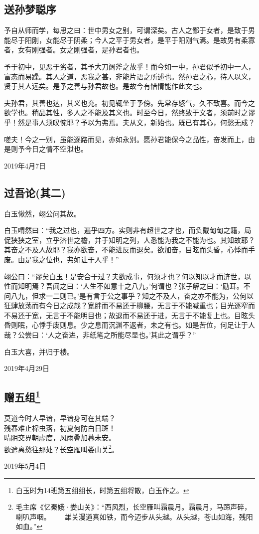 \documentclass[a5paper]{ctexart}
\begin{document}
	\subsection{送孙梦聪序}
	予自从师而学，每思之曰：世中男女之别，可谓深矣。古人之鄙于女者，是致于男能尽于阳刚，女能尽于阴柔；今人之平于男女者，是平于阳刚气焉。是故男有柔寡者，女有刚强者。女之刚强者，是孙君者也。
	
	予于初中，见恶于劣者，其予大刀阔斧之故乎！而今如一中，孙君似予初中一人，富态而易躁。其人之道，恶我之甚，非能片语之所述也。然孙君之心，待人以义，贤于其人远矣。是予之善与孙君故也。是故今有惜情能作此文也。
	
	夫孙君，其善也达，其义也充。初见辄坐于予傍。先常存怒气，久不致喜。而今之欲学也。稍品其性，多人之不能及其义也。时至今日，然终致于文者，须前时之谬乎！然是事人须叹惋耶？予以为弗焉。夫从文，新始也。既已有其心，何愁无成？
	
	嗟夫！今之一别，虽能逐路而见，亦如永别。愿孙君能保今之品性，奋发而上，由是则予今日之情不空泄也。
	\begin{flushright}
		2019年4月7日
	\end{flushright}
	
	
	\subsection{过吾论(其二)}
	白玉愀然，翊公问其故。
	
	白玉喟然曰：“我之过也，遍乎四方。实则非有超世之才也，而负戴甸甸之籍，局促狭狭之室，立乎济世之檐，并于知明之列，人悉能为我之不能为也。其知故耶？其奋之不及人故耶？我亦欲奋，不能进反而退矣。欲加奋，目眩而头昏，心悸而手废。由是我之位也，弗如让于人乎！”
	
	翊公曰：“谬矣白玉！是安合于过？夫欲成事，何须才也？何以知以才而济世，以性而知明焉？吾闻之曰：‘人生不如意十之八九，’何谓也？张子解之曰：‘励耳。不问八九，但求一二则已。’是有言于公之事乎？知之不及人，奋之亦不能为，公何以狂肆放荡而有今日之成哉？宽胖而不易还于柳腰，无言于不能减重也；目光逐窄而不易还于宽，无言于不能明目也；故退而不易还于进，无言于不能复上也。目眩头昏则眠，心悸手废则息。少之息而沉渊不返者，未之有也。如是苦位，何足让于人哉？公尝曰：‘人之奋进，非纸笔之所能尽显也。’其此之谓乎？”
	
	白玉大喜，并归于楼。
	\begin{flushright}
		2019年4月29日 
	\end{flushright}
	
	\subsection[赠五组]{赠五组\footnote{白玉时为14班第五组组长，时第五组将散，白玉作之。}}
	\begin{center}
		莫道今时人早谙，早谙身可在其端？\\
		残春难止棉虫落，初夏何防白日斑！\\
		晴阴交界朝虚度，风雨叠加暮未安。\\
		欲遣离愁往那处？长空雁叫娄山关\footnote{毛主席《忆秦娥·娄山关》：“西风烈，长空雁叫霜晨月。霜晨月，马蹄声碎，喇叭声咽。\ \ \ \ 雄关漫道真如铁，而今迈步从头越。从头越，苍山如海，残阳如血。”}。
	\end{center}
	\hfill 2019年5月4日
	
\end{document}
